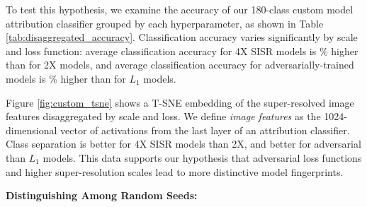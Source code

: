 \documentclass[10pt]{article} %
\begin{document}
To test this hypothesis, we examine the accuracy of our 180-class custom model attribution classifier grouped by each hyperparameter, as shown in Table \ref{tab:disaggregated_accuracy}. Classification accuracy varies significantly by scale and loss function: average classification accuracy for 4X SISR models is \valScaleAccRangeMean\% higher than for 2X models, and average classification accuracy for adversarially-trained models is \valLossAccRangeMean\% higher than for $L_1$ models. 

Figure \ref{fig:custom_tsne} shows a T-SNE embedding of the super-resolved image features disaggregated by scale and loss. We define \textit{image features} as the 1024-dimensional vector of activations from the last layer of an attribution classifier. Class separation is better for 4X SISR models than 2X, and better for adversarial than $L_1$ models. This data supports our hypothesis that adversarial loss functions and higher super-resolution scales lead to more distinctive model fingerprints.

\textbf{Distinguishing Among Random Seeds:}
\label{sec:seed_distinction}
\end{document}
